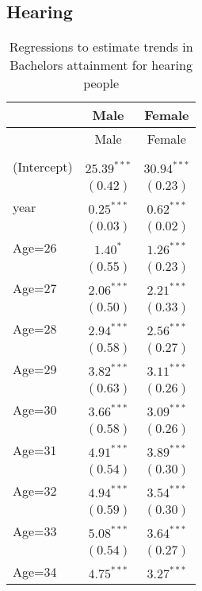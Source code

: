 \documentclass[fullpage]{paper}
\begin{document}
\subsection{ Hearing }

\begin{center}
\begin{longtable}{l c c }
\hline
 & Male & Female \\
\hline
\endfirsthead
\hline
 & Male & Female \\
\hline
\endhead
\hline
\endfoot
\hline
\multicolumn{3}{l}{\scriptsize{$^{***}p<0.001$, $^{**}p<0.01$, $^*p<0.05$}}\\
\caption{Regressions to estimate trends in Bachelors attainment for hearing people}
\label{table:coefficients}
\endlastfoot
(Intercept) & $25.39^{***}$ & $30.94^{***}$ \\
            & $(0.42)$      & $(0.23)$      \\
year        & $0.25^{***}$  & $0.62^{***}$  \\
            & $(0.03)$      & $(0.02)$      \\
Age=26      & $1.40^{*}$    & $1.26^{***}$  \\
            & $(0.55)$      & $(0.23)$      \\
Age=27      & $2.06^{***}$  & $2.21^{***}$  \\
            & $(0.50)$      & $(0.33)$      \\
Age=28      & $2.94^{***}$  & $2.56^{***}$  \\
            & $(0.58)$      & $(0.27)$      \\
Age=29      & $3.82^{***}$  & $3.11^{***}$  \\
            & $(0.63)$      & $(0.26)$      \\
Age=30      & $3.66^{***}$  & $3.09^{***}$  \\
            & $(0.58)$      & $(0.26)$      \\
Age=31      & $4.91^{***}$  & $3.89^{***}$  \\
            & $(0.54)$      & $(0.30)$      \\
Age=32      & $4.94^{***}$  & $3.54^{***}$  \\
            & $(0.59)$      & $(0.30)$      \\
Age=33      & $5.08^{***}$  & $3.64^{***}$  \\
            & $(0.54)$      & $(0.27)$      \\
Age=34      & $4.75^{***}$  & $3.27^{***}$  \\

\end{longtable}
\end{center}
\end{document}
